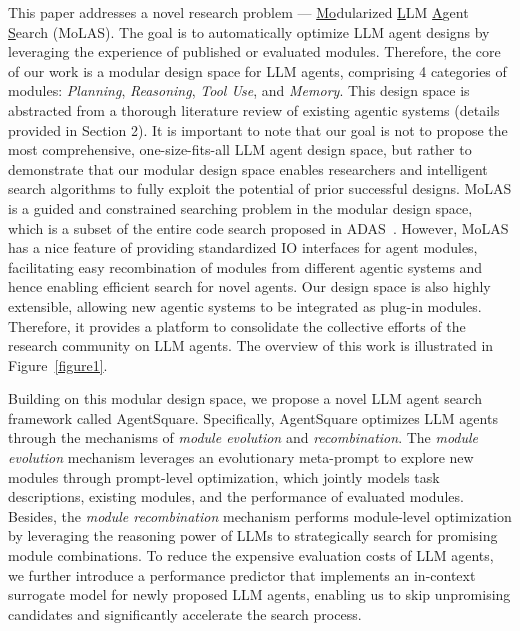 This paper addresses a novel research problem --- \underline{Mo}dularized \underline{L}LM \underline{A}gent \underline{S}earch (MoLAS). The goal is to automatically optimize LLM agent designs by leveraging the experience of published or evaluated modules. Therefore, the core of our work is a modular design space for LLM agents, comprising 4 categories of modules: \emph{Planning}, \emph{Reasoning}, \emph{Tool Use}, and \emph{Memory}. This design space is abstracted from a thorough literature review of existing agentic systems (details provided in Section 2). 
It is important to note that our goal is not to propose the most comprehensive, one-size-fits-all LLM agent design space, but rather to demonstrate that our modular design space enables researchers and intelligent search algorithms to fully exploit the potential of prior successful designs. 
MoLAS is a guided and constrained searching problem in the modular design space, which is a subset of the entire code search proposed in ADAS~\citep{hu2024automated}.
However, MoLAS has a nice feature of providing standardized IO interfaces for agent modules, facilitating easy recombination of modules from different agentic systems and hence enabling efficient search for novel agents. Our design space is also highly extensible, allowing new agentic systems to be integrated as plug-in modules. Therefore, it provides a platform to consolidate the collective efforts of the research community on LLM agents. The overview of this work is illustrated in Figure~\ref{figure1}.

Building on this modular design space, we propose a novel LLM agent search framework called AgentSquare. Specifically, AgentSquare optimizes LLM agents through the mechanisms of \emph{module evolution} and \emph{recombination}. The \emph{module evolution} mechanism leverages an evolutionary meta-prompt to explore new modules through prompt-level optimization, which jointly models task descriptions, existing modules, and the performance of evaluated modules. Besides, the \emph{module recombination} mechanism performs module-level optimization by leveraging the reasoning power of LLMs to strategically search for promising module combinations. To reduce the expensive evaluation costs of LLM agents, we further introduce a performance predictor that implements an in-context surrogate model for newly proposed LLM agents, enabling us to skip unpromising candidates and significantly accelerate the search process.

